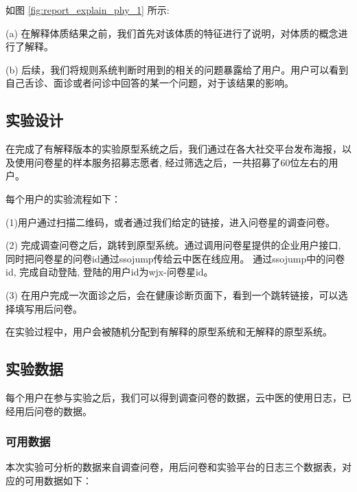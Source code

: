 如图 \ref{fig:report_explain_phy_1} 所示:

(a) 在解释体质结果之前，我们首先对该体质的特征进行了说明，对体质的概念进行了解释。

(b) 后续，我们将规则系统判断时用到的相关的问题暴露给了用户。用户可以看到自己舌诊、面诊或者问诊中回答的某一个问题，对于该结果的影响。


\subsection{实验设计}
在完成了有解释版本的实验原型系统之后，我们通过在各大社交平台发布海报，以及使用问卷星的样本服务招募志愿者, 经过筛选之后，一共招募了60位左右的用户。

每个用户的实验流程如下：

(1)用户通过扫描二维码，或者通过我们给定的链接，进入问卷星的调查问卷。

(2) 完成调查问卷之后，跳转到原型系统。通过调用问卷星提供的企业用户接口, 同时把问卷星的问卷id通过ssojump传给云中医在线应用。
通过ssojump中的问卷id, 完成自动登陆, 登陆的用户id为wjx-{问卷星id}。

(3) 在用户完成一次面诊之后，会在健康诊断页面下，看到一个跳转链接，可以选择填写用后问卷。

在实验过程中，用户会被随机分配到有解释的原型系统和无解释的原型系统。


\subsection{实验数据}
每个用户在参与实验之后，我们可以得到调查问卷的数据，云中医的使用日志，已经用后问卷的数据。

\subsubsection{可用数据}
本次实验可分析的数据来自调查问卷，用后问卷和实验平台的日志三个数据表，对应的可用数据如下：

